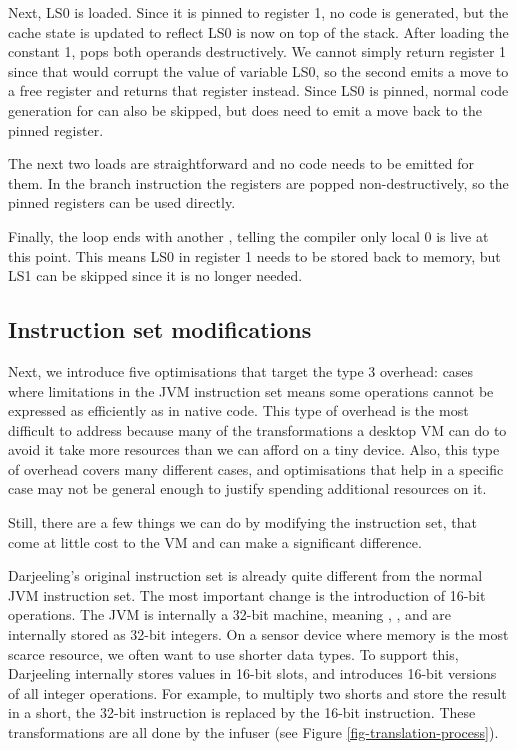 Next, LS0 is loaded. Since it is pinned to register 1, no code is generated, but the cache state is updated to reflect LS0 is now on top of the stack. After loading the constant 1,  pops both operands destructively. We cannot simply return register 1 since that would corrupt the value of variable LS0, so the second  emits a move to a free register and returns that register instead. Since LS0 is pinned, normal code generation for  can also be skipped, but  does need to emit a move back to the pinned register.

The next two loads are straightforward and no code needs to be emitted for them. In the branch instruction the registers are popped non-destructively, so the pinned registers can be used directly.

Finally, the loop ends with another , telling the compiler only local 0 is live at this point. This means LS0 in register 1 needs to be stored back to memory, but LS1 can be skipped since it is no longer needed.

\subsection{Instruction set modifications}
Next, we introduce five optimisations that target the type 3 overhead: cases where limitations in the JVM instruction set means some operations cannot be expressed as efficiently as in native code. This type of overhead is the most difficult to address because many of the transformations a desktop VM can do to avoid it take more resources than we can afford on a tiny device. Also, this type of overhead covers many different cases, and optimisations that help in a specific case may not be general enough to justify spending additional resources on it.

Still, there are a few things we can do by modifying the instruction set, that come at little cost to the VM and can make a significant difference.

Darjeeling's original instruction set is already quite different from the normal JVM instruction set. The most important change is the introduction of 16-bit operations. The JVM is internally a 32-bit machine, meaning , , and  are internally stored as 32-bit integers. On a sensor device where memory is the most scarce resource, we often want to use shorter data types. To support this, Darjeeling internally stores values in 16-bit slots, and introduces 16-bit versions of all integer operations. For example, to multiply two shorts and store the result in a short, the 32-bit  instruction is replaced by the 16-bit  instruction. These transformations are all done by the infuser (see Figure \ref{fig-translation-process}).

